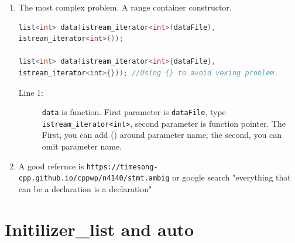 \documentclass[a4paper,11pt,twoside]{book}
\begin{document}
\begin{enumerate}
	
	\item The most complex problem. A range container constructor. 
\begin{lstlisting}[frame=single, language=c++, mathescape=true]
list<int> data(istream_iterator<int>(dataFile), 
istream_iterator<int>()); 

list<int> data(istream_iterator<int>{dataFile}, 
istream_iterator<int>{})); //Using {} to avoid vexing problem.  
\end{lstlisting}
\begin{description}

	\item[Line 1:] \texttt{data} is function. First parameter is \texttt{dataFile}, type \texttt{istream\_iterator<int>}, second parameter is function pointer. The First, you can add () around parameter name;  the second, you can omit parameter name.
	
\end{description}
		
	\item A good refernce is \verb|https://timesong-cpp.github.io/cppwp/n4140/stmt.ambig| or google search 
	"everything that can be a declaration is a declaration" 
	
\end{enumerate}



\section{Initilizer\_list and auto}
\end{document}
